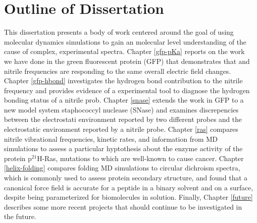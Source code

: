 \section{Outline of Dissertation} 

This dissertation presents a body of work centered around the goal of using molecular dynamics simulations to gain an molecular level understanding of the cause of complex, experimental spectra. 
Chapter \ref{gfp-pKa} reports on the work we have done in the green fluorescent protein (GFP) that demonstrates that \pKa{} and nitrile frequencies are responding to the same overall electric field changes. 
Chapter \ref{gfp-hbond} investigates the hydrogen bond contribution to the nitrile frequency and provides evidence of a experimental tool to diagnose the hydrogen bonding status of a nitrile prob. 
Chapter \ref{snase} extends the work in GFP to a new model system staphococcyl nuclease (SNase) and examines discrepencies between the electrostati environment reported by two different \pKa{} probes and the electrostatic environment reported by a nitrile probe. 
Chapter \ref{ras} compares nitrile vibrational frequencies, kinetic rates, and information from MD simulations to assess a particular hyptothesis about the enzyme activity of the protein p$^{21}$H-Ras, mutations to which are well-known to cause cancer. 
Chapter \ref{helix-folding} compares folding MD simulations to circular dichroism spectra, which is commonly used to assess protein secondary structure, and found that a canonical force field is accurate for a peptide in a binary solvent and on a surface, despite being parameterized for biomolecules in solution. 
Finally, Chapter \ref{future} describes some more recent projects that should continue to be investigated in the future. 


